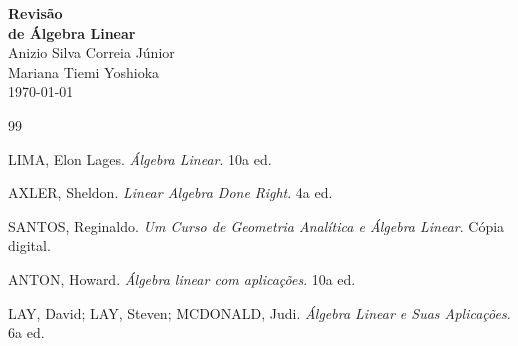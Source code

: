 \documentclass[12pt]{book}
\begin{document}
	
	\frontmatter
	
	\begin{titlepage}
		\centering
		\vspace*{2cm}
		{\Huge \textbf{Revisão \\ \vspace{0.2cm} de Álgebra Linear}} \\
		\vspace{1cm}
		{\Large Anizio Silva Correia Júnior} \\
		\vspace{0.2cm}
		{\Large Mariana Tiemi Yoshioka} \\
		\vspace{0.6cm}
		{\large \today} \\
		\vspace{2cm}
	\end{titlepage}
	
	\tableofcontents
	
	
	\mainmatter
	
	\newpage
	
	
	
	
	
	
	\backmatter
	
	\begin{thebibliography}{99}
		
		LIMA, Elon Lages. \textit{Álgebra Linear}. 10a ed.
		
		AXLER, Sheldon. \textit{Linear Algebra Done Right}. 4a ed.
		
		SANTOS, Reginaldo. \textit{Um Curso de Geometria Analítica e Álgebra Linear}. Cópia digital.
		
		ANTON, Howard. \textit{Álgebra linear com aplicações}. 10a ed.
		
		LAY, David; LAY, Steven; MCDONALD, Judi. \textit{Álgebra Linear e Suas Aplicações}. 6a ed.
		
	\end{thebibliography}
	
\end{document}
